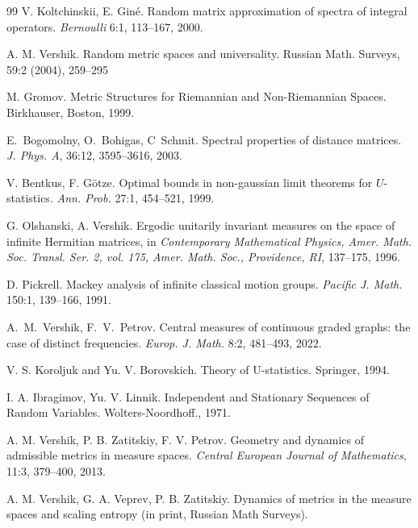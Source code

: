 \documentclass[11pt]{article}
\begin{document}
\begin{thebibliography}{99}
 V. Koltchinskii, E. Giné. Random matrix approximation of spectra of
integral operators. \emph{Bernoulli }6:1, 113--167, 2000.

A. M. Vershik. Random metric spaces and universality. Russian Math. Surveys, 59:2 (2004), 259--295

  M. Gromov. Metric Structures for Riemannian and Non-Riemannian Spaces. Birkhauser, Boston, 1999.

 E.~Bogomolny, O.~Bohigas, C~Schmit. Spectral properties of distance matrices.
\emph{J. Phys. A}, 36:12, 3595--3616, 2003.

 V. Bentkus, F. Götze. Optimal bounds in non-gaussian limit theorems for $U$-statistics.
\emph{Ann. Prob.} 27:1, 454--521, 1999.

 G. Olshanski, A. Vershik. Ergodic unitarily invariant measures on the space of infinite Hermitian matrices,
in \emph{Contemporary Mathematical Physics, Amer. Math. Soc. Transl. Ser. 2, vol. 175, Amer. Math. Soc.,
Providence, RI}, 137--175, 1996.

 D. Pickrell.
Mackey analysis of infinite classical motion groups.
\emph{Pacific J. Math.} 150:1, 139--166, 1991.

 A.~M.~Vershik, F.~V.~Petrov.
Central measures of continuous graded graphs: the case of distinct frequencies. \emph{
Europ. J. Math.} 8:2, 481--493, 2022.

 V. S. Koroljuk and Yu. V. Borovskich. Theory of U-statistics. Springer, 1994.

I. A. Ibragimov, Yu. V. Linnik.
Independent and Stationary Sequences of Random Variables. Wolters-Noordhoff., 1971.

  A. M. Vershik, P. B. Zatitskiy, F. V. Petrov. Geometry and dynamics of admissible metrics in measure spaces.  \emph{Central European Journal of Mathematics}, 11:3, 379--400, 2013.

 A. M. Vershik, G. A. Veprev, P. B. Zatitskiy. Dynamics of metrics in the measure spaces and scaling entropy (in print, Russian Math Surveys).
\end{thebibliography}
\end{document}
